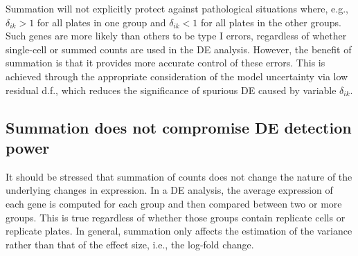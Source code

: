 \documentclass[oupdraft]{bio}
\begin{document}
Summation will not explicitly protect against pathological situations where, e.g., $\delta_{ik} > 1$ for all plates in one group and $\delta_{ik} < 1$ for all plates in the other groups.
Such genes are more likely than others to be type I errors, regardless of whether single-cell or summed counts are used in the DE analysis.
However, the benefit of summation is that it provides more accurate control of these errors.
This is achieved through the appropriate consideration of the model uncertainty via low residual d.f., which reduces the significance of spurious DE caused by variable $\delta_{ik}$.

\subsection{Summation does not compromise DE detection power}
It should be stressed that summation of counts does not change the nature of the underlying changes in expression.
In a DE analysis, the average expression of each gene is computed for each group and then compared between two or more groups.
This is true regardless of whether those groups contain replicate cells or replicate plates. 
In general, summation only affects the estimation of the variance rather than that of the effect size, i.e., the log-fold change.
\end{document}
